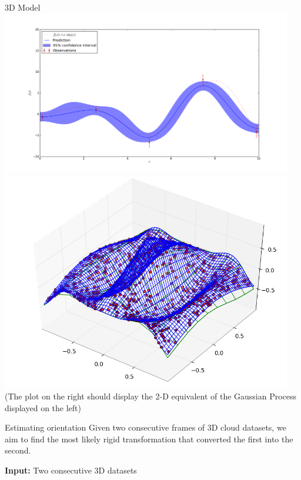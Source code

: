 \documentclass[final]{beamer}
\begin{document}
\begin{frame}{}
\begin{textblock}{27}
\begin{block}{3D Model}
\includegraphics[width=5in]{1DGaussianProcess.png}
\includegraphics[width=5in]{2DGaussianProcess.png}
(The plot on the right should display the 2-D equivalent of the Gaussian Process displayed on the left)
\end{block}

\begin{block}{Estimating orientation}
Given two consecutive frames of 3D cloud datasets, we aim to find the most likely rigid transformation that converted the first into the second.

\textbf{Input:} Two consecutive 3D datasets


\end{block}
\end{textblock}
\end{frame}
\end{document}
